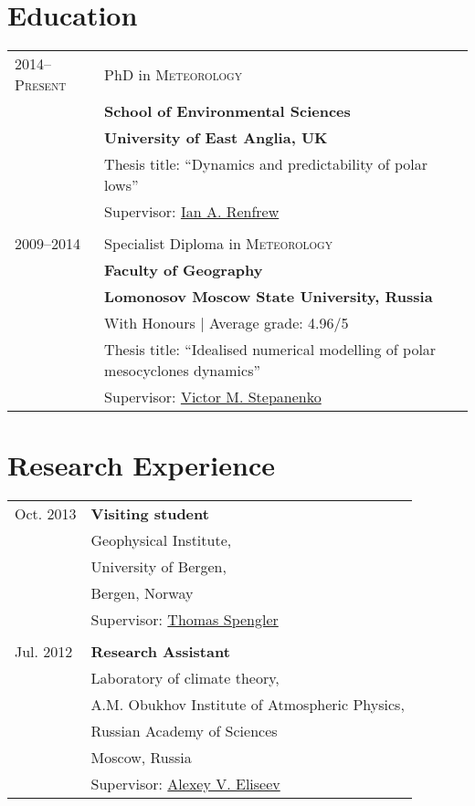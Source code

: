 \documentclass[a4paper,11pt]{article}
\newlength{\mycol}
\begin{document}
\section{Education}
\begin{tabu} to 
 \textsc{2014--\small{Present}} & PhD in \textsc{Meteorology}\\
& \textbf{School of Environmental Sciences} \\
& \textbf{University of East Anglia, UK} \\
& Thesis title: ``Dynamics and predictability of polar lows'' \\
& Supervisor: \href{mailto:I.Renfrew@uea.ac.uk}{Ian A. Renfrew} \\
 \\
 \textsc{2009--2014} & Specialist Diploma in \textsc{Meteorology}\\
& \textbf{Faculty of Geography} \\
& \textbf{Lomonosov Moscow State University, Russia} \\
& With Honours \hfill | Average grade: 4.96/5 
\\ %
& Thesis title: ``Idealised numerical modelling of polar mesocyclones dynamics'' \\
& Supervisor: \href{mailto:stepanen@srcc.msu.ru}{Victor M. Stepanenko}
\end{tabu}

\section{Research Experience}
\begin{tabu} to 
 {\small Oct.} 2013 & \textbf{Visiting student} \\
& Geophysical Institute, \\
& University of Bergen, \\
& Bergen, Norway \\
& Supervisor: \href{mailto:thomas.spengler@gfi.uib.no}{Thomas Spengler}\\
 \\
{\small Jul.} 2012 & \textbf{Research Assistant} \\
& Laboratory of climate theory, \\
& A.M. Obukhov Institute of Atmospheric Physics, \\
& Russian Academy of Sciences \\
& Moscow, Russia \\
& Supervisor: \href{mailto:eliseev@ifaran.ru}{Alexey V. Eliseev}\\
\end{tabu}
\end{document}
